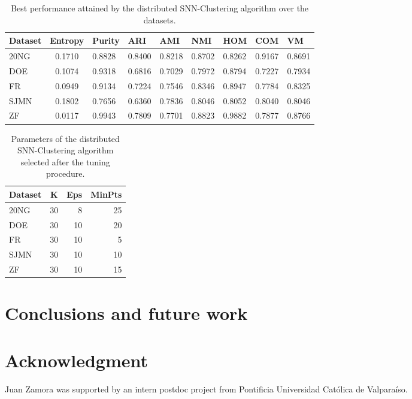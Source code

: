 \documentclass[a4paper]{article}
\begin{document}
\begin{table}[h]
\centering
\begin{tabular}{l|clllllll}
\textbf{Dataset} & \textbf{Entropy} & \textbf{Purity} & \textbf{ARI} & \textbf{AMI}  & \textbf{NMI} & \textbf{HOM} & \textbf{COM} & \textbf{VM} \\ \hline
20NG    & 0.1710 & 0.8828 & 0.8400 & 0.8218 & 0.8702 & 0.8262 & 0.9167 & 0.8691  \\
DOE     & 0.1074 & 0.9318 & 0.6816 & 0.7029 & 0.7972 & 0.8794 & 0.7227 & 0.7934  \\
FR      & 0.0949 & 0.9134 & 0.7224 & 0.7546 & 0.8346 & 0.8947 & 0.7784 & 0.8325  \\
SJMN    & 0.1802 & 0.7656 & 0.6360 & 0.7836 & 0.8046 & 0.8052 & 0.8040 & 0.8046  \\
ZF      & 0.0117 & 0.9943 & 0.7809 & 0.7701 & 0.8823 & 0.9882 & 0.7877 & 0.8766  \\ \hline
\end{tabular}
\caption{Best performance attained by the distributed SNN-Clustering algorithm over the datasets.}
\label{table:distributedsnn_results}
\end{table}

\begin{table}[h]
\centering
\begin{tabular}{l|crr}
\textbf{Dataset} & \textbf{K} & \textbf{Eps} & \textbf{MinPts} \\ \hline
20NG    & 30& 8 & 25 \\
DOE     & 30& 10& 20 \\
FR      & 30& 10& 5  \\
SJMN    & 30& 10& 10 \\
ZF      & 30& 10& 15 \\ \hline
\end{tabular}
\caption{Parameters of the distributed SNN-Clustering algorithm selected after the tuning procedure.}
\label{table:distributedsnn_params}
\end{table}

\section{Conclusions and future work}

\section{Acknowledgment}
Juan Zamora was supported by an intern postdoc project from Pontificia Universidad Cat\'olica de Valpara\'iso.
\clearpage 
\end{document}
